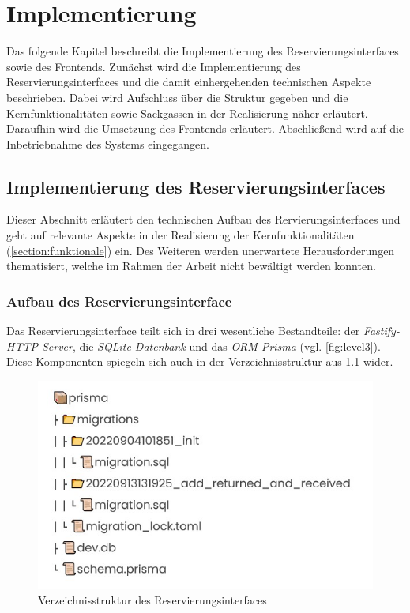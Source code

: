 
\chapter{Implementierung}
\label{chapter-implementierung}
Das folgende Kapitel beschreibt die Implementierung des Reservierungsinterfaces
sowie des Frontends. Zunächst wird die Implementierung des
Reservierungsinterfaces und die damit einhergehenden technischen Aspekte
beschrieben. Dabei wird Aufschluss über die Struktur gegeben und die
Kernfunktionalitäten sowie Sackgassen
in der Realisierung näher erläutert. Daraufhin wird die Umsetzung des
Frontends erläutert. Abschließend wird auf die Inbetriebnahme des Systems
eingegangen.


\section{Implementierung des Reservierungsinterfaces}
Dieser Abschnitt erläutert den technischen Aufbau des Rervierungsinterfaces und
geht auf relevante Aspekte in der Realisierung der Kernfunktionalitäten
(\ref{section:funktionale}) ein. Des Weiteren werden unerwartete
Herausforderungen thematisiert, welche im Rahmen der Arbeit nicht bewältigt
werden konnten.


\subsection{Aufbau des Reservierungsinterface}
Das Reservierungsinterface teilt sich in drei wesentliche Bestandteile:
der \textit{Fastify-HTTP-Server}, die \textit{SQLite Datenbank} und das \textit{ORM
  Prisma} (vgl. \ref{fig:level3}). Diese Komponenten spiegeln sich auch in der Verzeichnisstruktur aus \ref{fig:db} wider.

\begin{figure}[h]
  \centering
  \includegraphics[scale=0.7]{Bilder/Db.jpg}
  \caption[Verzeichnisstruktur des Reservierungsinterfaces]{Verzeichnisstruktur des Reservierungsinterfaces}
  \label{fig:db}
\end{figure}

